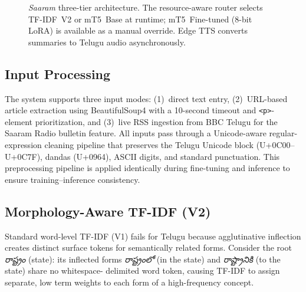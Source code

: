 \documentclass[runningheads]{llncs}
\begin{document}
\begin{figure}[t]
{}
\caption{\textit{Saaram} three-tier architecture. The resource-aware
router selects TF-IDF~V2 or mT5~Base at runtime; mT5~Fine-tuned
(8-bit LoRA) is available as a manual override. Edge TTS converts summaries
to Telugu audio asynchronously.}
\label{fig:arch}
\end{figure}

\subsection{Input Processing}
\label{sec:input}

The system supports three input modes: (1)~direct text entry, (2)~URL-based article extraction using BeautifulSoup4 with a 10-second timeout and \texttt{<p>}-element prioritization, and (3)~live RSS ingestion from BBC Telugu for the Saaram Radio bulletin feature. All inputs pass through a Unicode-aware regular-expression cleaning pipeline that preserves the Telugu Unicode block (U+0C00--U+0C7F), dandas (U+0964), ASCII digits, and standard punctuation. This preprocessing pipeline is applied identically during fine-tuning and inference to ensure training--inference consistency.


\subsection{Morphology-Aware TF-IDF (V2)}
\label{sec:tfidf}

Standard word-level TF-IDF (V1) fails for Telugu because
agglutinative inflection creates distinct surface tokens for
semantically related forms. Consider the root
\textit{{\telugufont రాష్ట్రం}} (state): its inflected forms
\textit{{\telugufont రాష్ట్రంలో}} (in the state) and
\textit{{\telugufont రాష్ట్రానికి}} (to the state) share no whitespace-
delimited word token, causing TF-IDF to assign separate, low
term weights to each form of a high-frequency concept.
\end{document}
